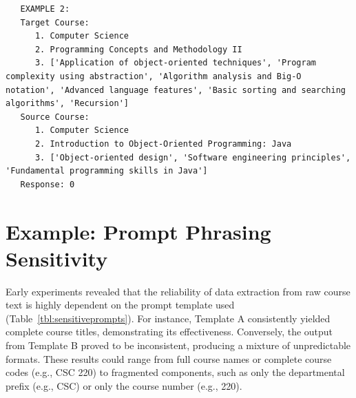 \begin{lstlisting}
   EXAMPLE 2:
   Target Course:
      1. Computer Science
      2. Programming Concepts and Methodology II
      3. ['Application of object-oriented techniques', 'Program complexity using abstraction', 'Algorithm analysis and Big-O notation', 'Advanced language features', 'Basic sorting and searching algorithms', 'Recursion']
   Source Course:
      1. Computer Science
      2. Introduction to Object-Oriented Programming: Java
      3. ['Object-oriented design', 'Software engineering principles', 'Fundamental programming skills in Java']
   Response: 0
\end{lstlisting}

\newpage
\section{Example: Prompt Phrasing Sensitivity}\label{app:promptphrasing}
Early experiments revealed that the reliability of data extraction from raw course text is highly dependent on the prompt template used (Table~\ref{tbl:sensitiveprompts}). For instance, Template A consistently yielded complete course titles, demonstrating its effectiveness. Conversely, the output from Template B proved to be inconsistent, producing a mixture of unpredictable formats. These results could range from full course names or complete course codes (e.g., CSC 220) to fragmented components, such as only the departmental prefix (e.g., CSC) or only the course number (e.g., 220).
